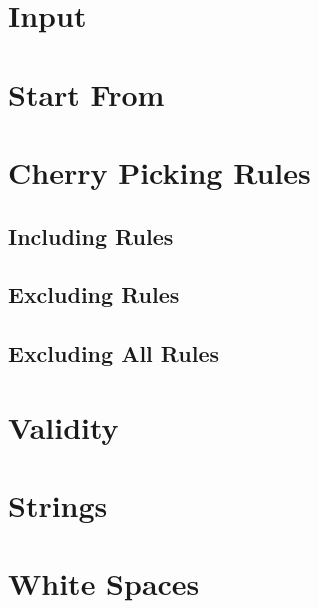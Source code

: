 \documentclass[10pt, a4paper]{article}
\begin{document}
    \section{Input}
    
    \clearpage
    
    \section{Start From}
    \label{sub:Start-From}
    
    
    \section{Cherry Picking Rules}
    
    
    \subsection{Including Rules}
    
    
    \subsection{Excluding Rules}
    
    
    \subsection{Excluding All Rules}
    
    \clearpage
    
    \section{Validity}
    

    \section{Strings}
    
    
    \section{White Spaces}
    
\end{document}
